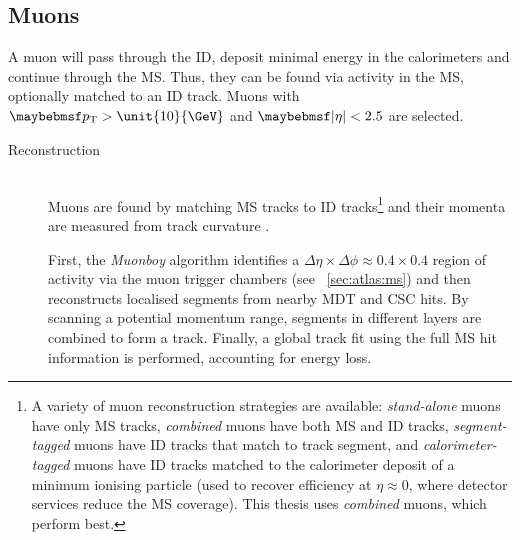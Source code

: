 \subsection{Muons}
\label{sec:objects:muons}

A muon will pass through the \ac{ID}, deposit minimal energy in the calorimeters and 
continue through the \ac{MS}. Thus, they can be found via activity in the \ac{MS}, 
optionally matched to an \ac{ID} track. Muons with $\pt > \unit{10}{\GeV}$ and 
$\mods{\eta} < 2.5$ are selected.

\begin{description}
\item[Reconstruction] \hfill \\
	Muons are found by matching \ac{MS} tracks to \ac{ID} tracks\footnote{
		A variety of muon reconstruction strategies are available: \textit{stand-alone} 
		muons have only \ac{MS} tracks, \textit{combined} muons have both \ac{MS} and 
		\ac{ID} tracks, \textit{segment-tagged} muons have \ac{ID} tracks that match to 
		 track segment, and \textit{calorimeter-tagged} muons have \ac{ID} 
		tracks matched to the calorimeter deposit of a minimum ionising particle (used to 
		recover efficiency at $\eta \approx 0$, where detector services reduce the \ac{MS}
		coverage). This thesis uses \textit{combined} muons, which perform best.
	}
	and their momenta are measured from track curvature \cite{ATLAS:ExpectPerf}.

	First, the \textit{Muonboy} algorithm \cite{Muons:algorithms} identifies a 
	$\Delta\eta \times \Delta\phi \approx 0.4 \times 0.4$ region of activity via the muon 
	trigger chambers (see \Section~\ref{sec:atlas:ms}) and then reconstructs localised 
	segments from nearby \acs{MDT} and \acs{CSC} hits. By scanning a potential momentum 
	range, segments in different layers are combined to form a track. Finally, a global 
	track fit using the full \ac{MS} hit information is performed, accounting for energy 
	loss.


\end{description}
